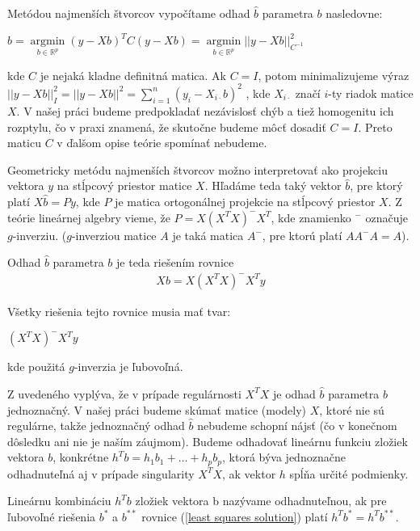 Metódou najmenších štvorcov vypočítame odhad $\hat{b}$ parametra $b$ nasledovne:

\begin{center}
$
\hat{b} = \underset{b \in \mathbb{R}^{p}}{\operatorname{arg min}} (y - Xb)^T C (y - Xb) =
\underset{b \in \mathbb{R}^{p}}{\operatorname{arg min}} ||y - Xb||_{C^{-1}}^2
$
\end{center}

kde $C$ je nejaká kladne definitná matica. 
Ak $C = I$, potom minimalizujeme výraz
$||y - Xb||_I^2 = ||y - Xb||^2 = \sum_{i=1}^n (y_i - X_{i \cdot } b)^2$
, kde $X_{i \cdot }$ značí $i$-ty riadok matice $X$.
V našej práci budeme predpokladať nezávislosť chýb a tiež homogenitu ich rozptylu, čo v praxi znamená,
že skutočne budeme môcť dosadiť $C = I$.
Preto maticu $C$ v ďalšom opise teórie spomínať nebudeme.

Geometricky metódu najmenších štvorcov možno interpretovať ako projekciu vektora $y$ 
na stĺpcový priestor matice $X$. Hľadáme teda taký vektor $\hat{b}$, 
pre ktorý platí $X \hat{b} = Py$, kde $P$ je matica ortogonálnej projekcie na stĺpcový priestor $X$. 
Z teórie lineárnej algebry vieme, že $P = X (X^T X)^- X^T$, kde znamienko $^-$ označuje $g$-inverziu.
($g$-inverziou matice $A$ je taká matica $A^-$, pre ktorú platí $A A^- A = A$).

Odhad $\hat{b}$ parametra $b$ je teda riešením rovnice
\begin{align}
\label{least squares solution}
X b =  X (X^T X)^- X^T y
\end{align}

Všetky riešenia tejto rovnice musia mať tvar:

\begin{center}
$
(X^T X)^- X^T y
$
\end{center}

kde použitá $g$-inverzia je ľubovoľná.

Z uvedeného vyplýva, že v prípade regulárnosti $X^T X$ je odhad $\hat{b}$ parametra $b$ jednoznačný. 
V našej práci budeme skúmať matice (modely) $X$, ktoré nie sú regulárne, 
takže jednoznačný odhad $\hat{b}$ nebudeme schopní nájsť (čo v konečnom dôsledku ani nie je naším záujmom).
Budeme odhadovať lineárnu funkciu zložiek vektora $b$, konkrétne $h^T b = h_1 b_1 + \ldots + h_p b_p$,
ktorá býva jednoznačne odhadnuteľná aj v prípade singularity $X^T X$, ak vektor $h$ spĺňa určité podmienky. 

\begin{defin}
Lineárnu kombináciu $h^T b$ zložiek vektora b nazývame odhadnuteľnou,
ak pre ľubovoľné riešenia $b^*$ a $b^{**}$ rovnice (\ref{least squares solution}) platí $h^T b^* = h^T b^{**}$.
\end{defin}


